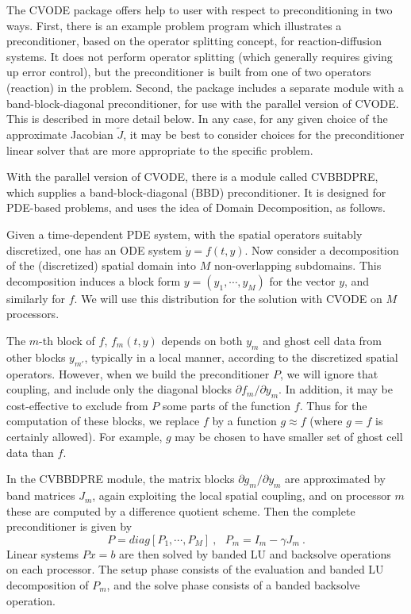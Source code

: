 The CVODE package offers help to user with respect to preconditioning
in two ways.  First, there is an example problem program which
illustrates a preconditioner, based on the operator splitting concept,
for reaction-diffusion systems.  It does not perform operator
splitting (which generally requires giving up error control), but the
preconditioner is built from one of two operators (reaction) in the
problem.  Second, the package includes a separate module with a
band-block-diagonal preconditioner, for use with the parallel version
of CVODE.  This is described in more detail below.  In any case, for
any given choice of the approximate Jacobian $\tilde{J}$, it may be
best to consider choices for the preconditioner linear solver that
are more appropriate to the specific problem.

With the parallel version of CVODE, there is a module called CVBBDPRE,
which supplies a band-block-diagonal (BBD) preconditioner.  It is
designed for PDE-based problems, and uses the idea of Domain
Decomposition, as follows.

Given a time-dependent PDE system, with the spatial operators suitably
discretized, one has an ODE system $\dot{y} = f(t,y)$.  Now consider a
decomposition of the (discretized) spatial domain into $M$
non-overlapping subdomains.  This decomposition induces a block form
$y = (y_1,\cdots,y_M)$ for the vector $y$, and similarly for $f$.  We
will use this distribution for the solution with CVODE on $M$
processors.

The $m$-th block of $f$, $f_m(t,y)$ depends on both $y_m$ and ghost
cell data from other blocks $y_{m'}$, typically in a local manner,
according to the discretized spatial operators.  However, when we
build the preconditioner $P$, we will ignore that coupling, and
include only the diagonal blocks $\partial f_m / \partial y_m$.  In
addition, it may be cost-effective to exclude from $P$ some parts of
the function $f$.  Thus for the computation of these blocks, we
replace $f$ by a function $g \approx f$ (where $g = f$ is certainly
allowed).  For example, $g$ may be chosen to have smaller set of ghost
cell data than $f$.

In the CVBBDPRE module, the matrix blocks $\partial g_m/\partial y_m$
are approximated by band matrices $J_m$, again exploiting the local
spatial coupling, and on processor $m$ these are computed by a
difference quotient scheme.  Then the complete preconditioner is given
by
\[ P = diag[P_1,\cdots,P_M] ~,~~~ P_m = I_m - \gamma J_m ~. \]
Linear systems $Px = b$ are then solved by banded LU and backsolve
operations on each processor.  The setup phase consists of the
evaluation and banded LU decomposition of $P_m$, and the solve phase
consists of a banded backsolve operation.

